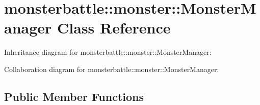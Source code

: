 \hypertarget{classmonsterbattle_1_1monster_1_1MonsterManager}{}\section{monsterbattle\+:\+:monster\+:\+:Monster\+Manager Class Reference}
\label{classmonsterbattle_1_1monster_1_1MonsterManager}


Inheritance diagram for monsterbattle\+:\+:monster\+:\+:Monster\+Manager\+:


Collaboration diagram for monsterbattle\+:\+:monster\+:\+:Monster\+Manager\+:
\subsection*{Public Member Functions}
